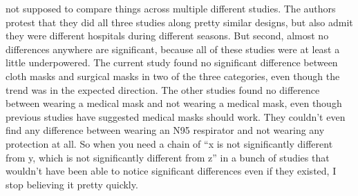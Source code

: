 \begin{xmlentries}
\begin{xmlentriescontent}
{ 
   not supposed to compare things across multiple different studies. The authors protest that they did all three studies along pretty similar designs, but also admit they were different hospitals during different seasons. But second, almost no differences anywhere are significant, because all of these studies were at least a little underpowered. The current study found no significant difference between cloth masks and surgical masks in two of the three categories, even though the trend was in the expected direction. The other studies found no difference between wearing a medical mask and not wearing a medical mask, even though previous studies have suggested medical masks should work. They couldn’t even find any difference between wearing an N95 respirator and not wearing any protection at all. So when you need a chain of “x is not significantly different from y, which is not significantly different from z” in a bunch of studies that wouldn’t have been able to notice significant differences even if they existed, I stop believing it pretty quickly.
}
\end{xmlentriescontent}
\end{xmlentries}
